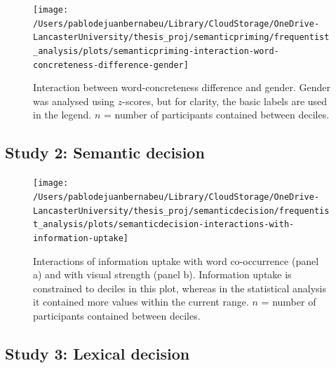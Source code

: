 \documentclass[
  12pt,
  man,floatsintext]{apa7}
\begin{document}
\begin{figure}

{\centering \texttt{[image: /Users/pablodejuanbernabeu/Library/CloudStorage/OneDrive-LancasterUniversity/thesis\_proj/semanticpriming/frequentist\_analysis/plots/semanticpriming-interaction-word-concreteness-difference-gender]} 

}

\caption{Interaction between word-concreteness difference and gender. Gender was analysed using \(z\)-scores, but for clarity, the basic labels are used in the legend. \(n\) = number of participants contained between deciles.}\label{fig:semanticpriming-interaction-word-concreteness-difference-gender}
\end{figure}

\clearpage

\hypertarget{study-2-semantic-decision-3}{%
\subsection{Study 2: Semantic decision}\label{study-2-semantic-decision-3}}



\begin{figure}

{\centering \texttt{[image: /Users/pablodejuanbernabeu/Library/CloudStorage/OneDrive-LancasterUniversity/thesis\_proj/semanticdecision/frequentist\_analysis/plots/semanticdecision-interactions-with-information-uptake]} 

}

\caption{Interactions of information uptake with word co-occurrence (panel a) and with visual strength (panel b). Information uptake is constrained to deciles in this plot, whereas in the statistical analysis it contained more values within the current range. \(n\) = number of participants contained between deciles.}\label{fig:semanticdecision-interactions-with-information-uptake}
\end{figure}

\clearpage

\hypertarget{study-3-lexical-decision-3}{%
\subsection{Study 3: Lexical decision}\label{study-3-lexical-decision-3}}
\end{document}
